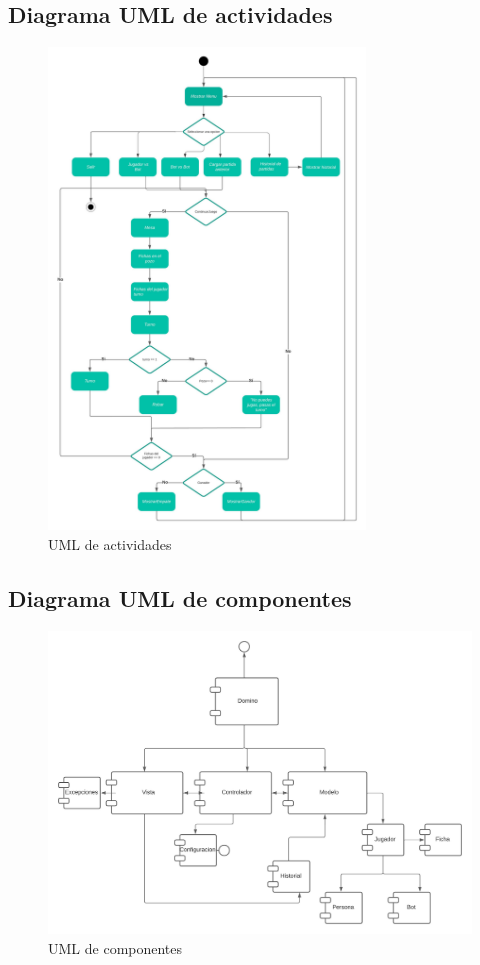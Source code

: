 \documentclass[12pt]{article}
\begin{document}
  \subsection{Diagrama UML de actividades}
  \begin{figure}[h!]
    \centering
    \includegraphics[width=0.75\textwidth]{umlact.jpeg}
    \caption{UML de actividades}
  \end{figure}

  \newpage
  \subsection{Diagrama UML de componentes}
  \begin{figure}[h!]
    \centering
    \includegraphics[width=\textwidth]{umlcomp.jpeg}
    \caption{UML de componentes}
  \end{figure}
\end{document}

